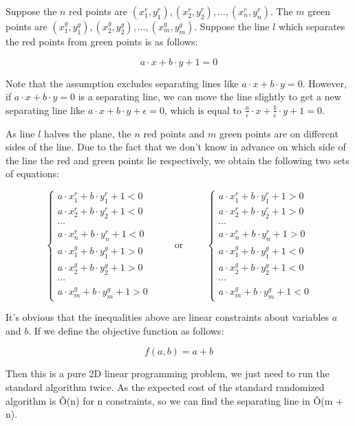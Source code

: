 
Suppose the $n$ red points are $(x_1^r, y_1^r), (x_2^r, y_2^r), \dots, (x_n^r, y_n^r)$. The $m$ green points are $(x_1^g, y_1^g), (x_2^g, y_2^g), \dots, (x_m^g, y_m^g)$. Suppose the line $l$ which separates the red points from green points is as follows:

\[
  a \cdot x + b \cdot y + 1 = 0
\]

Note that the assumption excludes separating lines like $a \cdot x + b \cdot y = 0$. However, if $a \cdot x + b \cdot y = 0$ is a separating line, we can move the line slightly to get a new separating line like $a \cdot x + b \cdot y + \epsilon = 0$, which is equal to $\frac{a}{\epsilon} \cdot x + \frac{b}{\epsilon} \cdot y + 1 = 0$.

As line $l$ halves the plane, the $n$ red points and $m$ green points are on different sides of the line. Due to the fact that we don't know in advance on which side of the line the red and green points lie respectively, we obtain the following two sets of equations:

\[
  \left\{
      \begin{array}{l}
          a \cdot x_1^r + b \cdot y_1^r + 1 < 0 \\
          a \cdot x_2^r + b \cdot y_2^r + 1 < 0 \\
          \cdots \\
          a \cdot x_n^r + b \cdot y_n^r + 1 < 0 \\
          a \cdot x_1^g + b \cdot y_1^g + 1 > 0 \\
          a \cdot x_2^g + b \cdot y_2^g + 1 > 0 \\
          \cdots \\
          a \cdot x_m^g + b \cdot y_m^g + 1 > 0
      \end{array}
  \right.
  \hspace{1cm}\text{or}\hspace{1cm}
  \left\{
      \begin{array}{l}
          a \cdot x_1^r + b \cdot y_1^r + 1 > 0 \\
          a \cdot x_2^r + b \cdot y_2^r + 1 > 0 \\
          \cdots \\
          a \cdot x_n^r + b \cdot y_n^r + 1 > 0 \\
          a \cdot x_1^g + b \cdot y_1^g + 1 < 0 \\
          a \cdot x_2^g + b \cdot y_2^g + 1 < 0 \\
          \cdots \\
          a \cdot x_m^g + b \cdot y_m^g + 1 < 0
      \end{array}
  \right.
\]

It's obvious that the inequalities above are linear constraints about variables $a$ and $b$. If we define the objective function as follows:

\[
  f(a, b) = a + b
\]

Then this is a pure 2D linear programming problem, we just need to run the standard algorithm twice. As the expected cost of the standard randomized algorithm is \~O(n) for n constraints, so we can find the separating line in \~O(m + n).
